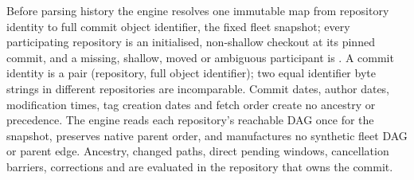\begin{definition}
\label{def:exec-fleet}
Before parsing history the engine resolves one immutable map from repository
identity to full commit object identifier, the fixed fleet snapshot; every
participating repository is an initialised, non-shallow checkout at its
pinned commit, and a missing, shallow, moved or ambiguous participant is
. A commit identity is a pair (repository, full object
identifier); two equal identifier byte strings in different repositories are
incomparable. Commit dates, author dates, modification times, tag creation
dates and fetch order create no ancestry or precedence. The engine reads each
repository's reachable DAG once for the snapshot, preserves native parent
order, and manufactures no synthetic fleet DAG or parent edge. Ancestry,
changed paths, direct pending windows, cancellation barriers, corrections and
 are evaluated in the repository that owns the commit.
\end{definition}

